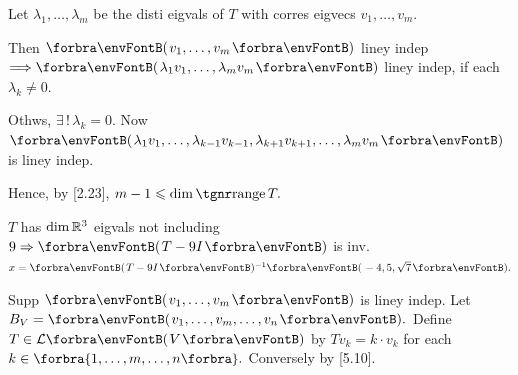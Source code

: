\par\quad
Let $\lambda_1,\dots,\lambda_m$ be the disti eigvals of $T$ with corres eigvecs $v_1,\dots,v_m.$\par\quad
{}\par\quad
Then $\Par{v_1,\dots,v_m}$ liney indep $\Longrightarrow\Par{\lambda_1 v_1,\dots,\lambda_m v_m}$ liney indep, if each $\lambda_k\neq 0.$\par\quad
Othws, $\exists\,!\,\lambda_k=0.$ Now $\Par{\lambda_1v_1,\dots,\lambda_{k-1}v_{k-1},\lambda_{k+1}v_{k+1},\dots,\lambda_mv_m}$ is liney indep.\par\quad
Hence, by [2.23], $m-1\leqslant\dim\range T.$\PfEnd
\SepLine

$T$ has $\dim{\mathbb{R}}^3$ eigvals not including $9\Rightarrow\Par{T-9I}$ is inv. $x=\Par{T-9I}{^{-1}}\Par{-4,5,\sqrt{7}}.$\PfEnd
\SepLine

Supp $\Par{v_1,\dots,v_m}$ is liney indep. Let $B_V=\Par{v_1,\dots,v_m,\dots,v_n}.$\parSol{}
Define $T\in\Lm{V}$ by $Tv_k=k\cdot v_k$ for each $k\in\Bra{1,\dots,m,\dots,n}.$ Conversely by [5.10].\PfEnd\vspace{-4pt}
\SepLine

